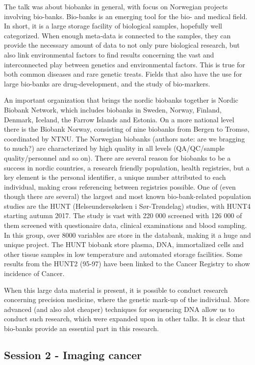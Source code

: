 \documentclass[12p]{article}
\begin{document}
The talk was about biobanks in general, with focus on Norwegian projects involving bio-banks.
Bio-banks is an emerging tool for the bio- and medical field.
In short, it is a large storage facility of biological samples, hopefully well categorized.
When enough meta-data is connected to the samples, they can provide the necessary amount of data to not only pure biological research, but also link environmental factors to find results concerning the vast and interconnected play between genetics and environmental factors.
This is true for both common diseases and rare genetic treats.
Fields that also have the use for large bio-banks are drug-development, and the study of bio-markers.

An important organization that brings the nordic biobanks together is Nordic Biobank Network, which includes biobanks in Sweden, Norway, Finland, Denmark, Iceland, the Farrow Islands and Estonia.
On a more national level there is the Biobank Norway, consisting of nine biobanks from Bergen to Tromsø, coordinated by NTNU.
The Norwegian biobanks (authors note: are we bragging to much?) are characterized by high quality in all levels (QA/QC/sample quality/personnel and so on).
There are several reason for biobanks to be a success in nordic countries, a research friendly population, health registries, but a key element is the personal identifier, a unique number attributed to each individual, making cross referencing between registries possible.
One of (even though there are several) the largest and most known bio-bank-related population studies are the HUNT (Helseundersøkelsen i Sør-Trøndelag) studies, with HUNT4 starting autumn 2017.
The study is vast with 220 000 screened with 126 000 of them screened with questionaire data, clinical examinations and blood sampling.
In this group, over 8000 variables are store in the databank, making it a huge and unique project.
The HUNT biobank store plasma, DNA, immortalized cells and other tissue samples in low temperature and automated storage facilities.
Some results from the HUNT2 (95-97) have been linked to the Cancer Registry to show incidence of Cancer.

When this large data material is present, it is possible to conduct research concerning precision medicine, where the genetic mark-up of the individual.
More advanced (and also alot cheaper) techniques for sequencing DNA allow us to conduct such research, which were expanded upon in other talks.
It is clear that bio-banks provide an essential part in this research.

\subsection*{Session 2 - Imaging cancer}
\end{document}
